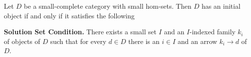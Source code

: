 Let $D$ be a small-complete category with small hom-sets. Then $D$ has an initial object if and only if it satisfies the following

\textbf{Solution Set Condition.} There exists a small set $I$ and an $I$-indexed family $k_i$ of objects of $D$ such that for every $d \in D$ there is an $i \in I$ and an arrow $k_i \rightarrow d$ of $D$.
